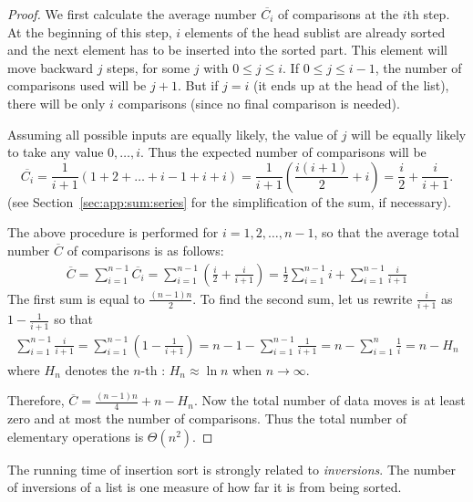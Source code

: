 \begin{proof}
We first calculate the average number \(\overline{C_{i}}\) of comparisons
at the $i$th step. At the beginning of this step, $i$ elements of the head 
sublist are already sorted and the next element has to be inserted into the 
sorted part. This element will move backward $j$ steps, for some $j$ with 
$0 \leq j \leq i$. If $0 \leq j \leq i - 1$, the number of comparisons used will
be $j + 1$. But if $j=i$ (it ends up at the head of the list), there will be 
only $i$ comparisons (since no final comparison is needed).

Assuming all possible inputs are equally likely, the value of $j$ will be equally
likely to take any value $0, \dots, i$. Thus the expected number of comparisons 
will be 
$$
\overline{C_{i}} = \frac{1}{i+1} \left( 1 + 2 + \dots + i - 1 + i + i\right) 
 = \frac{1}{i+1} \left ( \frac{i(i+1)}{2}+i \right )
=  \frac{i}{2} + \frac{i}{i+1}.
$$
(see Section~\ref{sec:app:sum:series} for the simplification of the sum, if 
necessary).

The above procedure is performed for
$i=1,2, \ldots, n-1$, so that the average total number $\overline{C}$ of
comparisons is as follows: 
\begin{eqnarray*} \overline{C}
= \sum\limits_{i=1}^{n-1}\overline{C_{i}} = \sum\limits_{i=1}^{n-1}\left
(\frac{i}{2} + \frac{i}{i+1}\right) = \frac{1}{2}\sum\limits_{i=1}^{n-1}i
+ \sum\limits_{i=1}^{n-1}\frac{i}{i+1} 
\end{eqnarray*} 
The first sum is
equal to \(\frac{(n-1)n}{2}\).  To find the second sum, let us rewrite
\(\frac{i}{i+1}\) as \(1 - \frac{1}{i+1}\) so that 
\begin{eqnarray*}
\sum\limits_{i=1}^{n-1}\frac{i}{i+1} = \sum\limits_{i=1}^{n-1}\left (
1 - \frac{1}{i+1}\right ) = n-1 - \sum\limits_{i=1}^{n-1}\frac{1}{i+1} =
n - \sum\limits_{i=1}^{n}\frac{1}{i} = n - H_{n} 
\end{eqnarray*} 
where \(H_{n}\) denotes the \(n\)-th : 
\(H_{n}\approx \ln n \) when $n \rightarrow \infty$.

Therefore, $\overline{C} = \frac{(n-1)n}{4}+n - H_{n}$.
Now the total number of data moves is at least zero and at most the number 
of comparisons. Thus the total number of elementary operations is $\Theta(n^2)$.
\end{proof}

The running time of insertion sort is strongly related to \emph{inversions}. 
The number of inversions of a list is one measure of how far it is from being 
sorted.

